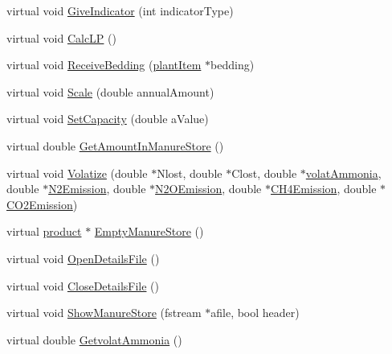 \begin{DoxyCompactItemize}
\item 
virtual void \hyperlink{classmanurestore_a0e71b577a0d53a31588784dd56c9b935}{GiveIndicator} (int indicatorType)
\item 
virtual void \hyperlink{classmanurestore_a4c5c76d30e639a9d791728d0e59e9cfa}{CalcLP} ()
\item 
virtual void \hyperlink{classmanurestore_a990ad099823ec82d8e2afd5a6379420b}{ReceiveBedding} (\hyperlink{classplant_item}{plantItem} $\ast$bedding)
\item 
virtual void \hyperlink{classmanurestore_a1efaaee1df384e1eb1705c104d8567c7}{Scale} (double annualAmount)
\item 
virtual void \hyperlink{classmanurestore_a0fb30db9d2c496a9234c53a1109c9415}{SetCapacity} (double aValue)
\item 
virtual double \hyperlink{classmanurestore_a6f665424507d6f813c0e955d3170ca66}{GetAmountInManureStore} ()
\item 
virtual void \hyperlink{classmanurestore_aa52a9cf95fe0bf10ce70efaea73a181c}{Volatize} (double $\ast$Nlost, double $\ast$Clost, double $\ast$\hyperlink{classmanurestore_ac9d398e432684fb02bfaf52c2f0e9ae8}{volatAmmonia}, double $\ast$\hyperlink{classmanurestore_a9a8d525f55145b43f2ab275fb9b5f35f}{N2Emission}, double $\ast$\hyperlink{classmanurestore_aca5ad359219f1f6c9a957f03156136ab}{N2OEmission}, double $\ast$\hyperlink{classmanurestore_ae472072caaaea49932fe2152e6a4fb09}{CH4Emission}, double $\ast$\hyperlink{classmanurestore_aebc6ae97114292e973c57cbc2ecc4f84}{CO2Emission})
\item 
virtual \hyperlink{classproduct}{product} $\ast$ \hyperlink{classmanurestore_a5609cf626143da62c4043487d00f3354}{EmptyManureStore} ()
\item 
virtual void \hyperlink{classmanurestore_afa2fa1cefd539b876b5b92250d55f03d}{OpenDetailsFile} ()
\item 
virtual void \hyperlink{classmanurestore_aff10675b3036964476b06dbcac290c89}{CloseDetailsFile} ()
\item 
virtual void \hyperlink{classmanurestore_aa710a7d090423b9f29334e18db8788d2}{ShowManureStore} (fstream $\ast$afile, bool header)
\item 
virtual double \hyperlink{classmanurestore_a87790b2d408734bf0c3d800fb3ec9157}{GetvolatAmmonia} ()
\end{DoxyCompactItemize}
